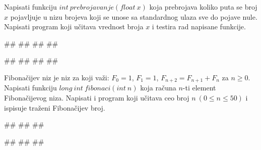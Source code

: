 \begin{Exercise}[label=p1.4_]
\begin{Exercise}[label=p1.4_16]
\end{Exercise}
\begin{Answer}[ref=p1.4_16]
\end{Answer}


\begin{Exercise}[label=p1.4_17] 
 Napisati funkciju $int\ prebrojavanje(float\ x)$ koja prebrojava koliko puta se broj $x$ pojavljuje u nizu brojeva koji se unose sa standardnog ulaza sve do pojave nule. Napisati program koji učitava vrednost broja $x$ i testira rad napisane funkcije. 

\begin{miditest}
\begin{upotreba}{1}
#\naslovInt#
##
##
##
\end{upotreba}
\end{miditest}
\begin{miditest}
\begin{upotreba}{2}
#\naslovInt#
##
##
##
\end{upotreba}
\end{miditest}

\end{Exercise}
\begin{Answer}[ref=p1.4_17]
\end{Answer}


\begin{Exercise}[label=p1.4_18] 
Fibonačijev niz je niz za koji važi: $F_0=1$, $F_1=1$, $F_{n+2}=F_{n+1}+F_{n}$ za $n \geq 0$.  Napisati funkciju $long\ int\ fibonaci(int\ n)$ koja računa $n$-ti element Fibonačijevog niza. Napisati i program koji učitava ceo broj $n\ (0\leq n\leq 50)$ i ispisuje traženi Fibonačijev broj. 

\begin{miditest}
\begin{upotreba}{1}
#\naslovInt#
##
##
\end{upotreba}
\end{miditest}
\begin{miditest}
\begin{upotreba}{2}
#\naslovInt#
##
##
\end{upotreba}
\end{miditest}


\end{Exercise}
\end{Exercise}
